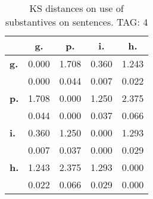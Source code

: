 \begin{table}[h!]
\begin{center}
\begin{tabular}{| l || c | c | c | c |}\hline
 & {\bf g.} & {\bf p.} & {\bf i.} & {\bf h.} \\\hline\hline
{\bf g.} & 0.000 & 1.708 & 0.360 & 1.243 \\
{\bf } & 0.000 & 0.044 & 0.007 & 0.022 \\\hline
{\bf p.} & 1.708 & 0.000 & 1.250 & 2.375 \\
{\bf } & 0.044 & 0.000 & 0.037 & 0.066 \\\hline
{\bf i.} & 0.360 & 1.250 & 0.000 & 1.293 \\
{\bf } & 0.007 & 0.037 & 0.000 & 0.029 \\\hline
{\bf h.} & 1.243 & 2.375 & 1.293 & 0.000 \\
{\bf } & 0.022 & 0.066 & 0.029 & 0.000 \\\hline
\end{tabular}
\caption{KS distances on use of substantives on sentences. TAG: 4}
\end{center}
\end{table}